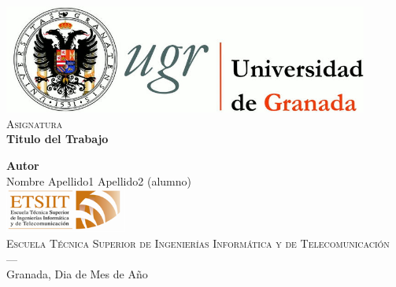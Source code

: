 \begin{titlepage}
  
\newlength{\centeroffset}
\setlength{\centeroffset}{-0.5\oddsidemargin}
\addtolength{\centeroffset}{0.5\evensidemargin}
\thispagestyle{empty}
\noindent\hspace*{\centeroffset}

\begin{minipage}{\textwidth}

\centering

\includegraphics[width=0.9\textwidth]{Images/UGR.jpg}\\[1.4cm]

\textsc{ \Large Asignatura\\[0.5cm]}
\Huge\bfseries Titulo del Trabajo\\

\end{minipage}

\vspace{2.5cm}
\noindent\hspace*{\centeroffset}\begin{minipage}{\textwidth}
\centering
\textbf{Autor}\\ {Nombre Apellido1 Apellido2 (alumno)}\\[3.5cm]

\includegraphics[width=0.3\textwidth]{Images/ETSIIT.png}\\[0.1cm]

\textsc{Escuela Técnica Superior de Ingenierías Informática y de Telecomunicación}\\
\textsc{---}\\Granada, Dia de Mes de Año

\end{minipage}

\end{titlepage}